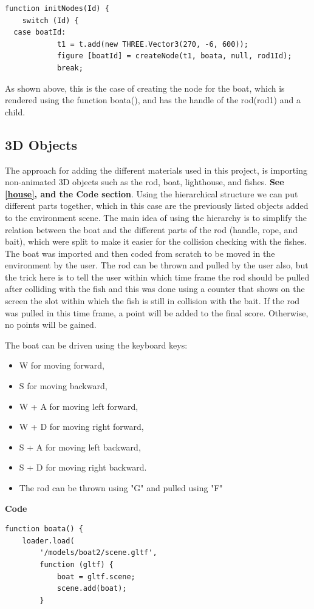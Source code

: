 \documentclass[paper=a4, fontsize=11pt]{scrartcl} %
\numberwithin{equation}{section} %
\numberwithin{figure}{section} %
\numberwithin{table}{section} %
\begin{document}
\begin{lstlisting}
function initNodes(Id) {
    switch (Id) {
  case boatId:
            t1 = t.add(new THREE.Vector3(270, -6, 600));
            figure [boatId] = createNode(t1, boata, null, rod1Id);
            break;
\end{lstlisting}

As shown above, this is the case of creating the node for the boat, which is rendered using the function boata(), and has the handle of the rod(rod1) and a child.
\subsection{3D Objects}

The approach for adding the different materials used in this project, is importing non-animated 3D objects such as the rod, boat, lighthouse, and fishes. \textbf{See \ref{house}, and the Code section}.
Using the hierarchical structure we can put different parts together, which in this case are the previously listed objects added to the environment scene. The main idea of using the hierarchy is to simplify the relation between the boat and the different parts of the rod (handle, rope, and bait), which were split to make it easier for the collision checking with the fishes. The boat was imported and then coded from scratch to be moved in the environment by the user. The rod can be thrown and pulled by the user also, but the trick here is to tell the user within which time frame the rod should be pulled after colliding with the fish and this was done using a counter that shows on the screen the slot within which the fish is still in collision with the bait. If the rod was pulled in this time frame, a point will be added to the final score. Otherwise, no points will be gained.\par
The boat can be driven using the keyboard keys:
\begin{itemize}
\item W for moving forward,
\item S for moving backward,
\item W + A for moving left forward,
\item W + D for moving right forward,
\item S + A for moving left backward,
\item S + D for moving right backward.
\item The rod can be thrown using "G" and pulled using "F" 
\end{itemize}
\newpage
\textbf{Code}
\begin{lstlisting}
function boata() {
    loader.load(
        '/models/boat2/scene.gltf',
        function (gltf) {
            boat = gltf.scene;
            scene.add(boat);
        }
\end{lstlisting}
\end{document}
